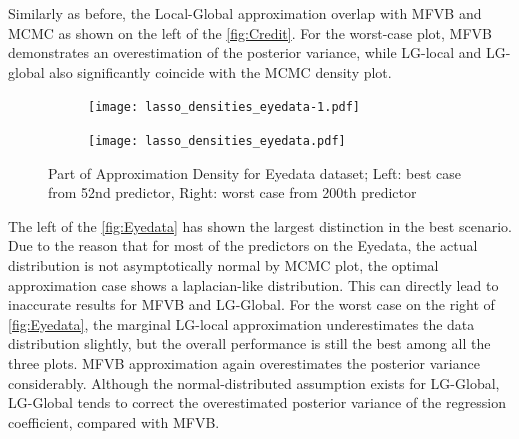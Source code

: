 Similarly as before, the Local-Global approximation overlap with MFVB and MCMC as shown on the left of the \autoref{fig:Credit}. For the worst-case plot, MFVB demonstrates an overestimation of the posterior variance, while LG-local and LG-global also significantly coincide with the MCMC density plot.\\
\begin{figure}[h]
	\begin{subfigure}{0.5\textwidth}
		\centering
		\texttt{[image: lasso\_densities\_eyedata-1.pdf]}
	\end{subfigure}
	\begin{subfigure}{0.5\textwidth}
		\texttt{[image: lasso\_densities\_eyedata.pdf]}
	\end{subfigure}
	\caption{Part of Approximation Density for Eyedata dataset; Left: best case from 52nd predictor, Right: worst case from 200th predictor}
	\label{fig:Eyedata}
\end{figure}
The left of the \autoref{fig:Eyedata} has shown the largest distinction in the best scenario. Due to the reason that for most of the predictors on the Eyedata, the actual distribution is not asymptotically normal by MCMC plot, the optimal approximation case shows a laplacian-like distribution. This can directly lead to inaccurate results for MFVB and LG-Global.
For the worst case on the right of \autoref{fig:Eyedata}, the marginal LG-local approximation underestimates the data distribution slightly, but the overall performance is still the best among all the three plots. MFVB approximation again overestimates the posterior variance considerably.
Although the normal-distributed assumption exists for LG-Global, LG-Global tends to correct the overestimated posterior variance of the regression coefficient, compared with MFVB. \\
\newpage
